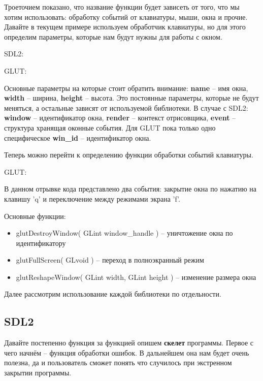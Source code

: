 Троеточием показано, что название функции будет зависеть от того, что мы хотим использовать: обработку 
событий от клавиатуры, мыши, окна и прочие. Давайте в текущем примере используем обработчик клавиатуры, но 
для этого определим параметры, которые нам будут нужны для работы с окном.

SDL2:


GLUT:


Основные параметры на которые стоит обратить внимание: \textbf{name} -- имя окна, \textbf{width} -- ширина, 
\textbf{height} -- высота. Это постоянные параметры, которые не будут меняться, а остальные зависят от 
используемой библиотеки. В случае с SDL2: \textbf{window} -- идентификатор окна, \textbf{render} -- контекст 
отрисовщика, \textbf{event} -- структура хранящая оконные события. Для GLUT пока только одно специфическое 
\textbf{win\_id} -- идентификатор окна.

Теперь можно перейти к определению функции обработки событий клавиатуры.

GLUT:


В данном отрывке кода представлено два события: закрытие окна по нажатию на клавишу 'q' и переключение между 
режимами экрана 'f'.

Основные функции:
\begin{itemize}
    \item glutDestroyWindow( GLint window\_handle ) -- уничтожение окна по идентификатору
    \item glutFullScreen( GLvoid ) -- переход в полноэкранный режим
    \item glutReshapeWindow( GLint width, GLint height ) -- изменение размера окна
\end{itemize}

Далее рассмотрим использование каждой библиотеки по отдельности.

\subsection{SDL2}
Давайте постепенно функция за функцией опишем \textbf{скелет} программы. Первое с чего начнём -- функция 
обработки ошибок. В дальнейшем она нам будет очень полезна, да и пользователь сможет понять что случилось при 
экстренном закрытии программы.

